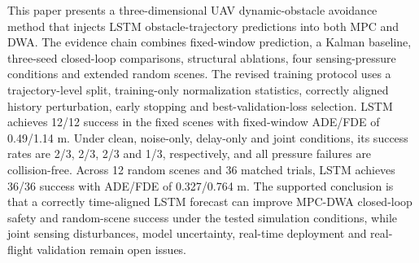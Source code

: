 \documentclass[10pt,a4paper]{article}
\begin{document}
This paper presents a three-dimensional UAV dynamic-obstacle avoidance method that injects LSTM obstacle-trajectory predictions into both MPC and DWA. The evidence chain combines fixed-window prediction, a Kalman baseline, three-seed closed-loop comparisons, structural ablations, four sensing-pressure conditions and extended random scenes. The revised training protocol uses a trajectory-level split, training-only normalization statistics, correctly aligned history perturbation, early stopping and best-validation-loss selection. LSTM achieves 12/12 success in the fixed scenes with fixed-window ADE/FDE of 0.49/1.14 m. Under clean, noise-only, delay-only and joint conditions, its success rates are 2/3, 2/3, 2/3 and 1/3, respectively, and all pressure failures are collision-free. Across 12 random scenes and 36 matched trials, LSTM achieves 36/36 success with ADE/FDE of 0.327/0.764 m. The supported conclusion is that a correctly time-aligned LSTM forecast can improve MPC-DWA closed-loop safety and random-scene success under the tested simulation conditions, while joint sensing disturbances, model uncertainty, real-time deployment and real-flight validation remain open issues.
\end{document}
